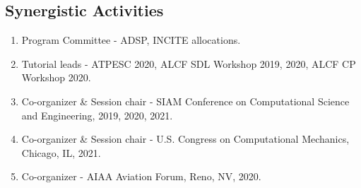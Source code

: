 \documentclass[11pt]{article}
\begin{document}
\subsection*{Synergistic Activities}
\begin{enumerate}
\parskip = -2pt
%
\item Program Committee - ADSP, INCITE allocations.
\item Tutorial leads - ATPESC 2020, ALCF SDL Workshop 2019, 2020, ALCF CP Workshop 2020.
\item Co-organizer \& Session chair - SIAM Conference on Computational Science and Engineering, 2019, 2020, 2021.
\item Co-organizer \& Session chair - U.S. Congress on Computational Mechanics, Chicago, IL, 2021.
\item Co-organizer - AIAA Aviation Forum, Reno, NV, 2020.
\end{enumerate}
\end{document}
